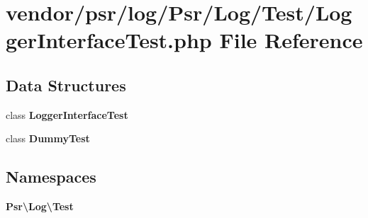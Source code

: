 \section{vendor/psr/log/\+Psr/\+Log/\+Test/\+Logger\+Interface\+Test.php File Reference}
\label{_logger_interface_test_8php}
\subsection*{Data Structures}
\begin{DoxyCompactItemize}
\item 
class {\bf Logger\+Interface\+Test}
\item 
class {\bf Dummy\+Test}
\end{DoxyCompactItemize}
\subsection*{Namespaces}
\begin{DoxyCompactItemize}
\item 
 {\bf Psr\textbackslash{}\+Log\textbackslash{}\+Test}
\end{DoxyCompactItemize}
